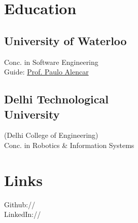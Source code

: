 \documentclass[]{Vishnu-Resume}
\begin{document}
%
%
\lastupdated

%
%


%
%

\begin{minipage}[t]{0.33\textwidth} 


\section{Education} 

\subsection{University of Waterloo}
Conc. in Software Engineering \\
Guide: \href{https://cs.uwaterloo.ca/about/people/palencar}{Prof. Paulo Alencar}\\
\sectionsep

\subsection{Delhi Technological \\University}
(Delhi College of Engineering)\\
Conc. in Robotics \& Information Systems \\
\sectionsep


\section{Links} 
Github:// \href{https://github.com/zxingz}{} \\
LinkedIn://  \href{https://www.linkedin.com/in/zxingz/}{} \\
\sectionsep


\end{minipage}
\end{document}
